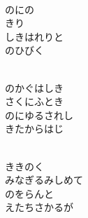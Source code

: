 \documentclass[10pt,b5j]{tarticle} %
\begin{document}
\vspace{1.5em} %
\newcommand{\linespace}{0.5em} %
\newcommand{\blocksize}{0.5\hsize} %
\newcommand{\itemmargin}{3em} %
\begin{enumerate} %
    \setlength{\itemindent}{\itemmargin} %
    \begin{minipage}[c]{\blocksize}
    
        \vspace{\linespace}
        \item~\\
        のにの\\
        きり\\
        しきはれりと\\
        のひびく
        
    \end{minipage}
    \begin{minipage}[c]{\blocksize}
        
        \vspace{\linespace}
        \item~\\
        のかぐはしき\\
        さくにふとき\\
        のにゆるされし\\
        きたからはじ
        
    \end{minipage}
    \begin{minipage}[c]{\blocksize}
        
        \vspace{\linespace}
        \item~\\
        ききのく\\
        みなぎるみしめて\\
        のをらんと\\
        えたちさかるが
        
    \end{minipage}
    \begin{minipage}[c]{\blocksize}
        

\end{minipage}
\end{enumerate}
\end{document}
